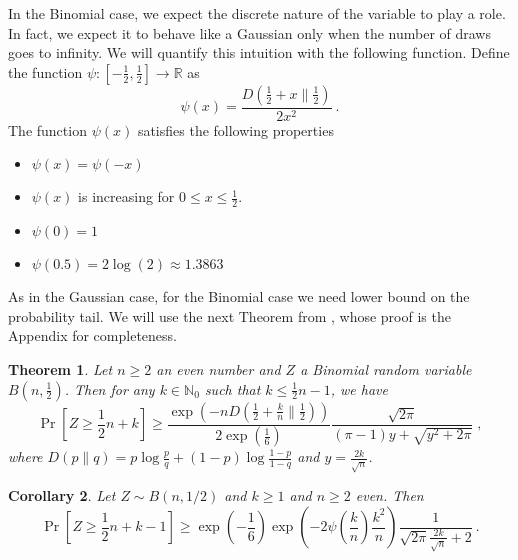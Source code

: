 \documentclass{article}
\newcommand{\field}[1]{\mathbb{#1}}
\newcommand{\R}{\field{R}}
\newcommand{\Nat}{\field{N}}
\newtheorem{theorem}{Theorem}
\newtheorem{corrollary}[theorem]{Corollary}
\begin{document}
In the Binomial case, we expect the discrete nature of the variable to play a
role. In fact, we expect it to behave like a Gaussian only when the number of
draws goes to infinity.  We will quantify this intuition with the following
function.  Define the function $\psi:[-\frac{1}{2},\frac{1}{2}] \to \R$ as
$$
\psi(x) = \frac{D(\frac{1}{2}+x\|\frac{1}{2})}{2 x^2}~.
$$
The function $\psi(x)$ satisfies the following properties
\begin{itemize}
\item $\psi(x) = \psi(-x)$
\item $\psi(x)$ is increasing for $0\le x \le \frac{1}{2}$.
\item $\psi(0) = 1$
\item $\psi(0.5) = 2 \log(2) \approx 1.3863$
\end{itemize}

As in the Gaussian case, for the Binomial case we need lower bound on the
probability tail.  We will use the next Theorem from \cite{nOrabona13}, whose
proof is the Appendix for completeness.

\begin{theorem}
\label{theorem:bin}
Let $n \ge 2$ an even number and $Z$ a Binomial random variable
$B(n,\frac{1}{2})$. Then for any $k \in \Nat_0$ such that $k\le
\frac{1}{2}n-1$, we have
$$
\Pr \left[ Z \ge \frac{1}{2} n + k\right]
\ge \frac{\exp\left(-n D(\frac{1}{2}+\frac{k}{n}\|\frac{1}{2})\right)}{2 \exp\left(\frac{1}{6}\right)} \frac{\sqrt{2 \pi}}{(\pi-1)y+\sqrt{y^2+2 \pi}} \; ,
$$
where $D(p\|q)=p \log \frac{p}{q}+(1-p) \log\frac{1-p}{1-q}$ and $y=\frac{2 k}{\sqrt{n}}$.
\end{theorem}

\begin{corrollary}
Let $Z \sim B(n, 1/2)$ and $k \ge 1$ and $n \ge 2$ even. Then
$$
\Pr \left[ Z \ge \frac{1}{2} n + k-1 \right] \ge \exp\left(-\frac{1}{6}\right) \exp\left(- 2 \psi\left(\frac{k}{n}\right) \frac{k^2}{n} \right) \frac{1}{\sqrt{2\pi} \frac{2 k}{\sqrt{n}} + 2 }~.
$$
\end{corrollary}
\end{document}
